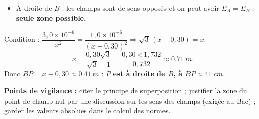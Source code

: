 \documentclass[11pt]{article}
\begin{document}
\begin{corrige}
\begin{enumerate}
\begin{itemize}
\item À droite de $B$ : les champs sont de sens opposés et on peut avoir $E_A = E_B$ : \textbf{seule zone possible}.
\end{itemize}
Condition : $\dfrac{3,0\times 10^{-6}}{x^2} = \dfrac{1,0\times 10^{-6}}{(x-0,30)^2} \Rightarrow \sqrt{3}\,(x - 0,30) = x$.
\[ x = \frac{0,30\sqrt{3}}{\sqrt{3}-1} = \frac{0,30\times 1,732}{0,732} \approx \SI{0,71}{m}. \]
Donc $BP = x - 0,30 \approx \SI{0,41}{m}$ : \textbf{$P$ est à droite de $B$, à $BP \approx \SI{41}{cm}$}.
\end{enumerate}
\textbf{Points de vigilance :} citer le principe de superposition ; justifier la zone du point de champ nul par une discussion sur les sens des champs (exigée au Bac) ; garder les valeurs absolues dans le calcul des normes.
\end{corrige}
\end{document}
